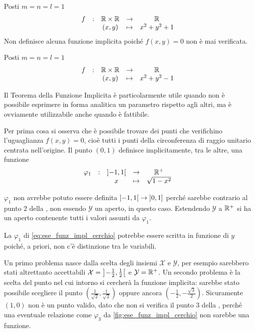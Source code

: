 \begin{example}
	Posti $m = n = l = 1$
	\[\begin{array}{ccccc} {f} & : & {\mathbb{R} \times \mathbb{R}} & \to & {\mathbb{R}} \\ & & {(x,y)} & \mapsto & {x^2 + y^2 + 1} \\ \end{array}\]
	Non definisce alcuna funzione implicita poiché $f(x,y) = 0$ non è mai verificata.
\end{example}
\begin{example}
	Posti $m = n = l = 1$
	\[\begin{array}{ccccc} {f} & : & {\mathbb{R} \times \mathbb{R}} & \to & {\mathbb{R}} \\ & & {(x,y)} & \mapsto & {x^2 + y^2 - 1} \\ \end{array}\]
	\begin{note}
		Il Teorema della Funzione Implicita è particolarmente utile quando non è possibile esprimere in forma analitica un parametro rispetto agli altri, ma è ovviamente utilizzabile anche quando è fattibile.
	\end{note}
	Per prima cosa si osserva che è possibile trovare dei punti che verifichino l'uguaglianza $f(x,y) = 0$, cioè tutti i punti della circonferenza di raggio unitario centrata nell'origine. Il punto $(0,1)$ definisce implicitamente, tra le altre, una funzione
	\begin{equation}
		\label{eq:ese_funz_impl_cerchio}
		\begin{array}{ccccc} {\varphi_1} & : & {\left]-1,1\right[} & \to & {\mathbb{R}^+} \\ & & {x} & \mapsto & {\sqrt{1-x^2}} \\ \end{array}
	\end{equation}
	\begin{note}
		$\varphi_1$ non avrebbe potuto essere definita $\left]-1,1\right[ \to \left]0,1\right]$ perché sarebbe contrario al punto 2 della , non essendo $\mathcal{Y}$ un aperto, in questo caso. Estendendo $\mathcal{Y}$ a $\mathbb{R}^+$ si ha un aperto contenente tutti i valori assunti da $\varphi_1$.
	\end{note}
	\begin{note}
		La $\varphi_1$ di \cref{eq:ese_funz_impl_cerchio} potrebbe essere scritta in funzione di $y$ poiché, a priori, non c'è distinzione tra le variabili.
	\end{note}
	Un primo problema nasce dalla scelta degli insiemi $\mathcal{X}$ e $\mathcal{Y}$, per esempio sarebbero stati altrettanto accettabili $\mathcal{X} = \left]-\frac{1}{2},\frac{1}{2}\right[$ e $\mathcal{Y} = \mathbb{R}^+ $. Un secondo problema è la scelta del punto nel cui intorno si cercherà la funzione implicita: sarebbe stato possibile scegliere il punto $\left(\frac{1}{\sqrt{2}},\frac{1}{\sqrt{2}}\right)$ oppure ancora $\left(-\frac{1}{2},-\frac{\sqrt{3}}{2}\right)$. Sicuramente $(1,0)$ non è un punto valido, dato che non si verifica il punto 3 della , perché una eventuale relazione come $\varphi_3$ da \autoref{fig:ese_funz_impl_cerchio} non sarebbe una funzione.
	~
	\begin{figure}[H]

\end{figure}
\end{example}
